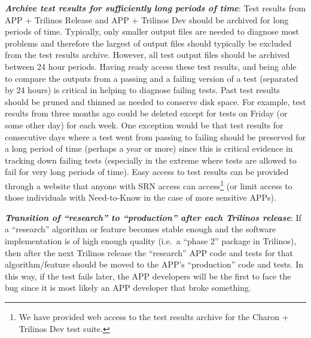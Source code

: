 \documentclass[pdf,ps2pdf,11pt]{SANDreport}
\begin{document}
{}\textit{\textbf{Archive test results for sufficiently long periods of
time}}: Test results from APP + Trilinos Release and APP + Trilinos Dev should
be archived for long periods of time.  Typically, only smaller output files
are needed to diagnose most problems and therefore the largest of output files
should typically be excluded from the test results archive.  However, all test
output files should be archived between 24 hour periods.  Having ready access
these test results, and being able to compare the outputs from a passing and a
failing version of a test (separated by 24 hours) is critical in helping to
diagnose failing tests.  Past test results should be pruned and thinned as
needed to conserve disk space.  For example, test results from three months
ago could be deleted except for tests on Friday (or some other day) for each
week.  One exception would be that test results for consecutive days where a
test went from passing to failing should be preserved for a long period of
time (perhaps a year or more) since this is critical evidence in tracking down
failing tests (especially in the extreme where tests are allowed to fail for
very long periods of time).  Easy access to test results can be provided
through a website that anyone with SRN access can access\footnote{We have
provided web access to the test results archive for the Charon + Trilinos Dev
test suite.} (or limit access to those individuals with Need-to-Know in the
case of more sensitive APPs).

{}\textit{\textbf{Transition of ``research'' to ``production'' after each
Trilinos release}}: If a ``research'' algorithm or feature becomes stable
enough and the software implementation is of high enough quality (i.e.\ a
``phase 2'' package in Trilinos), then after the next Trilinos release the
``research'' APP code and tests for that algorithm/feature should be moved to
the APP's ``production'' code and tests.  In this way, if the test fails
later, the APP developers will be the first to face the bug since it is most
likely an APP developer that broke something.
\end{document}

